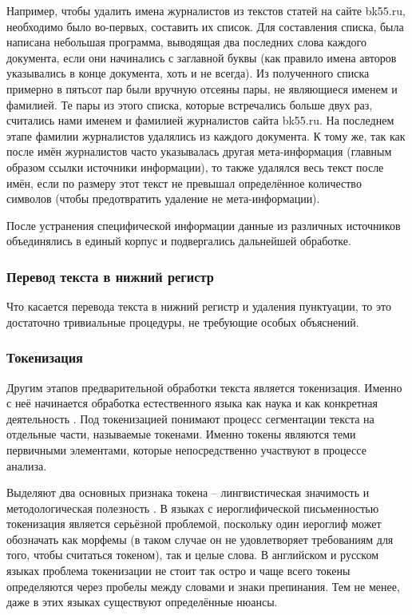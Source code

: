 Например, чтобы удалить имена журналистов из текстов статей на сайте bk55.ru, необходимо было во-первых, составить их список. Для составления списка, была написана небольшая программа, выводящая два последних слова каждого документа, если они начинались с заглавной буквы (как правило имена авторов указывались в конце документа, хоть и не всегда). Из полученного списка примерно в пятьсот пар были вручную отсеяны пары, не являющиеся именем и фамилией. Те пары из этого списка, которые встречались больше двух раз, считались нами именем и фамилией журналистов сайта bk55.ru. На последнем этапе фамилии журналистов удалялись из каждого документа. К тому же, так как после имён журналистов часто указывалась другая мета-информация (главным образом ссылки источники информации), то также удалялся весь текст после имён, если по размеру этот текст не превышал определённое количество символов (чтобы предотвратить удаление не мета-информации). 

После устранения специфической информации данные из различных источников объединялись в единый корпус и подвергались дальнейшей обработке.

\subsubsection{Перевод текста в нижний регистр}
Что касается перевода текста в нижний регистр и удаления пунктуации, то это достаточно тривиальные процедуры, не требующие особых объяснений.

\subsubsection{Токенизация}
Другим этапов предварительной обработки текста является токенизация. Именно с неё начинается обработка естественного языка как наука и как конкретная деятельность \cite{Webster1992}. Под токенизацией понимают процесс сегментации текста на отдельные части, называемые токенами. Именно токены являются теми первичными элементами, которые непосредственно участвуют в процессе анализа. 

Выделяют два основных признака токена -- лингвистическая значимость и методологическая полезность \cite[стр. 1106]{Webster1992}. В языках с иероглифической письменностью токенизация является серьёзной проблемой, поскольку один иероглиф может обозначать как морфемы (в таком случае он не удовлетворяет требованиям для того, чтобы считаться токеном), так и целые слова. В английском и русском языках проблема токенизации не стоит так остро и чаще всего токены определяются через пробелы между словами и знаки препинания. Тем не менее, даже в этих языках существуют определённые нюансы.

